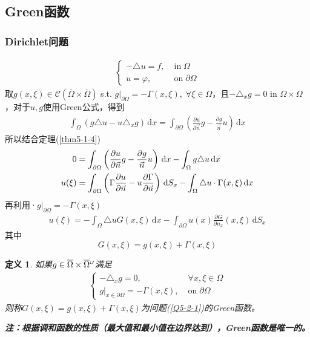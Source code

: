 \documentclass[11pt, a4paper]{article}
\theoremstyle{theorem}
\newtheorem{definition}[thm]{定义}
\newcommand{\intd}[1]{\,\mathrm{d}{#1}}
\begin{document}
\subsection{Green函数}

\subsubsection{Dirichlet问题}

\begin{align}
    \label{Q5-2-1}
    \begin{cases}
        - \triangle u = f, \; &\text{in} \; \Omega \\
        u = \varphi, \; &\text{on} \; \partial \Omega
    \end{cases}
\end{align}
取$g(x,\xi) \in \mathcal{C}(\overline{\Omega} \times \overline{\Omega})$ s.t. $g \bigg|_{\partial \Omega} = - \Gamma(x, \xi), \; \forall \xi \in \Omega$，且$- \triangle_x g = 0$ in $\Omega \times \Omega$，对于$u,g$使用Green公式，得到
\begin{align}
    \int_\Omega (g \triangle u - u \triangle_x g ) \intd x = \int_{\partial \Omega} \left(\frac{\partial u}{\partial \vec{n}} g - \frac{\partial g}{\vec{n}} u\right) \intd x
\end{align}
所以结合定理(\ref{thm5-1-4})
\begin{align}
    0 &= \int_{\partial \Omega} \left(\frac{\partial u}{\partial \vec{n}} g - \frac{\partial g}{\vec{n}} u\right) \intd x - \int_\Omega g \triangle u \intd x \notag \\
    u(\xi) &= \int_{\partial \Omega} \left(\Gamma \frac{\partial u}{\partial \vec{n}} - u \frac{\partial \Gamma}{\partial \vec{n}}\right) \intd S_x - \int_\Omega \triangle u \cdot \Gamma(x, \xi) \intd x
\end{align}
再利用·$g \bigg|_{\partial \Omega} = - \Gamma(x, \xi)$
\begin{align}
\label{equ5-2-2}
    u(\xi) = - \int_\Omega \triangle u G(x,\xi) \intd x - \int_{\partial \Omega} u(x) \frac{\partial G}{\partial n_x} (x,\xi) \intd S_x
\end{align}
其中
$$
G(x,\xi) = g(x,\xi) + \Gamma(x,\xi)
$$

\begin{definition}
    如果$g \in \overline{\Omega} \times \overline{\Omega}`'$满足
    \begin{align}
        \begin{cases}
            - \triangle_x g = 0, \; &\forall x,\xi \in \Omega \\
            g \bigg|_{x \in \partial \Omega} = - \Gamma(x,\xi), \; &\text{on} \; \partial \Omega
        \end{cases}
    \end{align}
    则称$G(x,\xi) = g(x,\xi) + \Gamma(x,\xi)$为问题(\ref{Q5-2-1})的Green函数。

    \textbf{注：根据调和函数的性质（最大值和最小值在边界达到），Green函数是唯一的。}
\end{definition}
\end{document}
